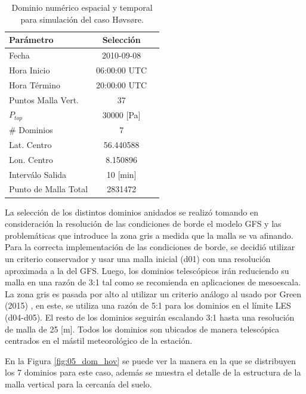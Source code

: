 \begin{table}[h!]
	\caption{Dominio numérico espacial y temporal para simulación del caso Høvsøre.}\label{tab:05_config_hov}
	\centering\footnotesize
	\begin{tabular}{lcc}
		\toprule
		Parámetro & Selección \\
		\midrule
		Fecha	 	 & 2010-09-08   \\
		Hora Inicio	 	 & 06:00:00   UTC \\
		Hora Término	 		 & 20:00:00 UTC  \\
		Puntos Malla Vert.	 	 & 37   \\
		$P_{top}$ 	& 30000 [Pa]\\
		\# Dominios	& 7   \\
		Lat. Centro	& 56.440588   \\
		Lon. Centro	& 8.150896   \\
		Interválo Salida & 10 [min]\\
		Punto de Malla Total & 2831472\\
		\bottomrule
	\end{tabular}
\end{table}

La selección de los distintos dominios anidados se realizó tomando en consideración la resolución de las condiciones de borde el modelo GFS y las problemáticas que introduce la zona gris a medida que la malla se va afinando. Para la correcta implementación de las condiciones de borde, se decidió utilizar un criterio conservador y usar una malla inicial (d01) con una resolución aproximada a la del GFS. Luego, los dominios telescópicos irán reduciendo su malla en una razón de 3:1 tal como se recomienda en aplicaciones de mesoescala. La zona gris es pasada por alto al utilizar un criterio análogo al usado por Green (2015) \cite{Green2015}, en este, se utiliza una razón de 5:1 para los dominios en el límite LES (d04-d05). El resto de los dominios seguirán escalando 3:1 hasta una resolución de malla de 25 [m]. Todos los dominios son ubicados de manera telescópica centrados en el mástil meteorológico de la estación.

En la Figura \ref{fig:05_dom_hov} se puede ver la manera en la que se distribuyen los 7 dominios para este caso, además se muestra el detalle de la estructura de la malla vertical para la cercanía del suelo.

